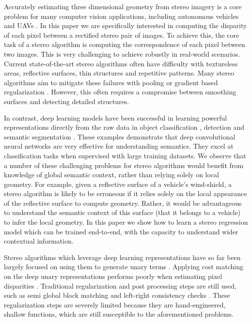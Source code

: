 \documentclass[10pt,twocolumn,letterpaper]{article}
\begin{document}
Accurately estimating three dimensional geometry from stereo imagery is a core problem for many computer vision applications, including autonomous vehicles and UAVs \cite{achtelik2009stereo}. In this paper we are specifically interested in computing the disparity of each pixel between a rectified stereo pair of images. To achieve this, the core task of a stereo algorithm is computing the correspondence of each pixel between two images. This is very challenging to achieve robustly in real-world scenarios. Current state-of-the-art stereo algorithms often have difficulty with textureless areas, reflective surfaces, thin structures and repetitive patterns. Many stereo algorithms aim to mitigate these failures with pooling or gradient based regularization \cite{geiger2010efficient,hirschmuller2005accurate}. However, this often requires a compromise between smoothing surfaces and detecting detailed structures.

In contrast, deep learning models have been successful in learning powerful representations directly from the raw data in object classification \cite{krizhevsky2012imagenet}, detection \cite{girshick2014rich} and semantic segmentation \cite{long2015fully,badrinarayanan2015segnet}. These examples demonstrate that deep convolutional neural networks are very effective for understanding semantics. They excel at classification tasks when supervised with large training datasets. We observe that a number of these challenging problems for stereo algorithms would benefit from knowledge of global semantic context, rather than relying solely on local geometry. For example, given a reflective surface of a vehicle's wind-shield, a stereo algorithm is likely to be erroneous if it relies solely on the local appearance of the reflective surface to compute geometry. Rather, it would be advantageous to understand the semantic context of this surface (that it belongs to a vehicle) to infer the local geometry. In this paper we show how to learn a stereo regression model which can be trained end-to-end, with the capacity to understand wider contextual information.

Stereo algorithms which leverage deep learning representations have so far been largely focused on using them to generate unary terms \cite{zbontar2015computing,luo2016efficient}. Applying cost matching on the deep unary representations performs poorly when estimating pixel disparities \cite{luo2016efficient,zbontar2015computing}. Traditional regularization and post processing steps are still used, such as semi global block matching and left-right consistency checks \cite{hirschmuller2005accurate}. These regularization steps are severely limited because they are hand-engineered, shallow functions, which are still susceptible to the aforementioned problems.
\end{document}
